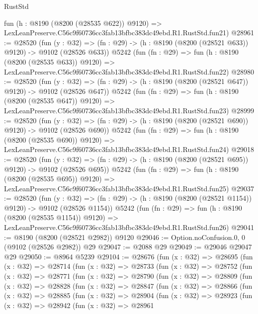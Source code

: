 \begin{lexlean}{RustStd}
\begin{coremodule}
    fun (h : @8190 (@8200 (@28535 @622)) @9120) =>
    LexLeanPreserve.C56c9f60736cc3fab13bfbc383dc49ebd.R1.RustStd.fun21)
@28961 := @28520
    (fun (y : @32) => (fn : @29) -> (h : @8190 (@8200 (@28521 @633)) @9120) -> @9102 (@28526 @633))
    @5242
    (fun (fn : @29) =>
    fun (h : @8190 (@8200 (@28535 @633)) @9120) =>
    LexLeanPreserve.C56c9f60736cc3fab13bfbc383dc49ebd.R1.RustStd.fun22)
@28980 := @28520
    (fun (y : @32) => (fn : @29) -> (h : @8190 (@8200 (@28521 @647)) @9120) -> @9102 (@28526 @647))
    @5242
    (fun (fn : @29) =>
    fun (h : @8190 (@8200 (@28535 @647)) @9120) =>
    LexLeanPreserve.C56c9f60736cc3fab13bfbc383dc49ebd.R1.RustStd.fun23)
@28999 := @28520
    (fun (y : @32) => (fn : @29) -> (h : @8190 (@8200 (@28521 @690)) @9120) -> @9102 (@28526 @690))
    @5242
    (fun (fn : @29) =>
    fun (h : @8190 (@8200 (@28535 @690)) @9120) =>
    LexLeanPreserve.C56c9f60736cc3fab13bfbc383dc49ebd.R1.RustStd.fun24)
@29018 := @28520
    (fun (y : @32) => (fn : @29) -> (h : @8190 (@8200 (@28521 @695)) @9120) -> @9102 (@28526 @695))
    @5242
    (fun (fn : @29) =>
    fun (h : @8190 (@8200 (@28535 @695)) @9120) =>
    LexLeanPreserve.C56c9f60736cc3fab13bfbc383dc49ebd.R1.RustStd.fun25)
@29037 := @28520
    (fun (y : @32) =>
    (fn : @29) -> (h : @8190 (@8200 (@28521 @1154)) @9120) -> @9102 (@28526 @1154))
    @5242
    (fun (fn : @29) =>
    fun (h : @8190 (@8200 (@28535 @1154)) @9120) =>
    LexLeanPreserve.C56c9f60736cc3fab13bfbc383dc49ebd.R1.RustStd.fun26)
@29041 := @8190 (@8200 (@28521 @2982)) @9120
@29046 := Option.noConfusion.{0, 0} (@9102 (@28526 @2982)) @29
@29047 := @2088 @29
@29049 := @29046 @29047 @29
@29050 := @8964 @5239
@29104 := @28676
    (fun (x : @32) =>
    @28695
      (fun (x : @32) =>
      @28714
        (fun (x : @32) =>
        @28733
          (fun (x : @32) =>
          @28752
            (fun (x : @32) =>
            @28771
              (fun (x : @32) =>
              @28790
                (fun (x : @32) =>
                @28809
                  (fun (x : @32) =>
                  @28828
                    (fun (x : @32) =>
                    @28847
                      (fun (x : @32) =>
                      @28866
                        (fun (x : @32) =>
                        @28885
                          (fun (x : @32) =>
                          @28904
                            (fun (x : @32) =>
                            @28923
                              (fun (x : @32) =>
                              @28942
                                (fun (x : @32) =>
                                @28961

\end{coremodule}
\end{lexlean}
